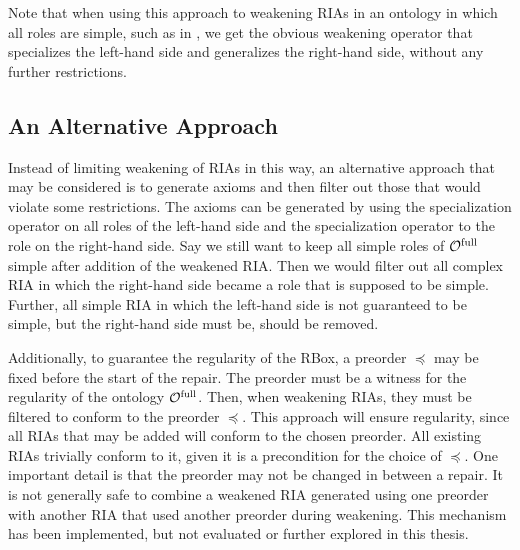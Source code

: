 Note that when using this approach to weakening RIAs in an ontology in which all roles are simple, such as in \ALCH, we get the obvious weakening operator that specializes the left-hand side and generalizes the right-hand side, without any further restrictions.

\subsection{An Alternative Approach}\label{rbox-alternative}

Instead of limiting weakening of RIAs in this way, an alternative approach that may be considered is to generate axioms and then filter out those that would violate some restrictions. The axioms can be generated by using the specialization operator on all roles of the left-hand side and the specialization operator to the role on the right-hand side. Say we still want to keep all simple roles of ${\mathcal{O}^\textnormal{full}}$ simple after addition of the weakened RIA. Then we would filter out all complex RIA in which the right-hand side became a role that is supposed to be simple. Further, all simple RIA in which the left-hand side is not guaranteed to be simple, but the right-hand side must be, should be removed.

Additionally, to guarantee the regularity of the RBox, a preorder $\preceq$ may be fixed before the start of the repair. The preorder must be a witness for the regularity of the ontology ${\mathcal{O}^\textnormal{full}}$. Then, when weakening RIAs, they must be filtered to conform to the preorder $\preceq$. This approach will ensure regularity, since all RIAs that may be added will conform to the chosen preorder. All existing RIAs trivially conform to it, given it is a precondition for the choice of $\preceq$. One important detail is that the preorder may not be changed in between a repair. It is not generally safe to combine a weakened RIA generated using one preorder with another RIA that used another preorder during weakening. This mechanism has been implemented, but not evaluated or further explored in this thesis.
